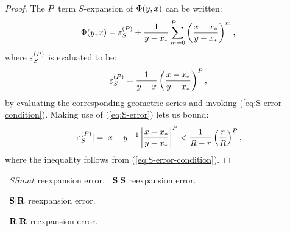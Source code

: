 \begin{proof}
  The $P$ term $S$-expansion of $\Phi(y, x)$ can be
  written:
  \begin{align}
    \label{eq:S-expansion}
    \Phi(y, x) = {\varepsilon}^{(P)}_{S} + \frac{1}{y - {x}_{*}} \sum_{m=0}^{P-1} \left(\frac{x - {x}_{*}}{y - {x}_{*}}\right)^m,
  \end{align}
  where ${\varepsilon}^{(P)}_{S}$ is evaluated to be:
  \begin{align}
    \label{eq:S-error}
    {\varepsilon}^{(P)}_{S} = \frac{1}{y - x} \left(\frac{x - {x}_{*}}{y - {x}_{*}}\right)^P,
  \end{align}
  by evaluating the corresponding geometric series and invoking
  (\ref{eq:S-error-condition}). Making use of (\ref{eq:S-error}) lets
  us bound:
  \begin{align}
    \label{eq:S-error-bound}
    |{\varepsilon}^{(P)}_{S}| = |x - y|^{-1} \left|\frac{x - {x}_{*}}{y - {x}_{*}}\right|^P < \frac{1}{R - r} \left(\frac{r}{R}\right)^P,
  \end{align}
  where the inequality follows from (\ref{eq:S-error-condition}).
\end{proof}

\begin{lemma}
  \label{lemma:SS-error}
  \TODO\ $SSmat$ reexpansion error.
  \TODO\ $\bold{S}|\bold{S}$ reexpansion error.
\end{lemma}

\begin{lemma}
  \label{lemma:SR-error}
  \TODO\ $\bold{S}|\bold{R}$ reexpansion error.
\end{lemma}

\begin{lemma}
  \label{lemma:RR-error}
  \TODO\ $\bold{R}|\bold{R}$ reexpansion error.
\end{lemma}

